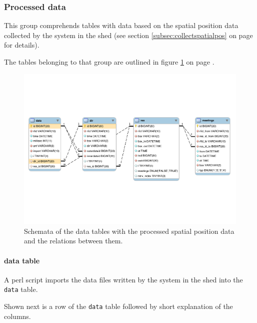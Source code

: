 \subsubsection{Processed data}

This group comprehends tables with data based on the spatial position data collected by the system in the shed (see section \ref{subsec:collectspatialpos} on page \pageref{subsec:collectspatialpos} for details).

The tables belonging to that group are outlined in figure \ref{fig:processed_data_schema} on page \pageref{fig:processed_data_schema}.
 
\begin{figure}[htpb]
\begin{center}
  \includegraphics[width=\textwidth]{assets/pdf/processed_data_schema.pdf}
  \caption[Schema of database tables with processed data]{Schemata of the data tables with the processed spatial position data and the relations between them.}
  \label{fig:processed_data_schema}
\end{center}
\end{figure}

\paragraph{data table}
\label{para:data_table}

A \ac{perl} script imports the data files written by the system in the shed into the \lstinline|data| table. 

Shown next is a row of the \lstinline|data| table followed by short explanation of the columns.

